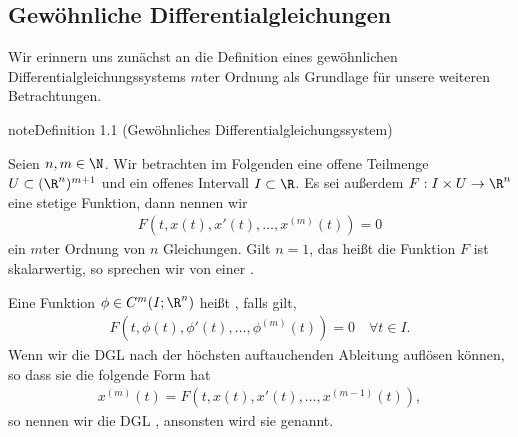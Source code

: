 \documentclass[letterpaper,10pt,english]{jupyterBook}
\begin{document}
\subsection{Gewöhnliche Differentialgleichungen}
\label{\detokenize{ode/repetition:gewohnliche-differentialgleichungen}}
\sphinxAtStartPar
Wir erinnern uns zunächst an die Definition eines gewöhnlichen Differentialgleichungssystems \(m\)\sphinxhyphen{}ter Ordnung als Grundlage für unsere weiteren Betrachtungen.
\label{ode/repetition:def:DGL}
\begin{sphinxadmonition}{note}{Definition 1.1 (Gewöhnliches Differentialgleichungssystem)}



\sphinxAtStartPar
Seien \(n,m \in \N\).
Wir betrachten im Folgenden eine offene Teilmenge \(U\subset (\R^n)^{m+1}\) und ein offenes Intervall \(I\subset\R\).
Es sei außerdem \(F:I\times U\rightarrow\R^n\) eine stetige Funktion, dann nennen wir
\begin{equation}\label{equation:ode/repetition:eq:DGL}
\begin{split}F(t,x(t),x'(t),\ldots,x^{(m)}(t)) = 0\end{split}
\end{equation}
\sphinxAtStartPar
ein  \(m\)\sphinxhyphen{}ter Ordnung von \(n\) Gleichungen.
Gilt \(n=1\), das heißt die Funktion \(F\) ist skalarwertig, so sprechen wir von einer .

\sphinxAtStartPar
Eine Funktion \(\phi\in C^m(I;\R^n)\) heißt , falls gilt,
\begin{equation*}
\begin{split}F(t, \phi(t), \phi'(t), \ldots, \phi^{(m)}(t)) = 0 \quad \forall t\in I.\end{split}
\end{equation*}
\sphinxAtStartPar
Wenn wir die DGL nach der höchsten auftauchenden Ableitung auflösen können, so dass sie die folgende Form hat
\begin{equation*}
\begin{split}x^{(m)}(t) = F(t,x(t),x'(t),\ldots,x^{(m-1)}(t)),\end{split}
\end{equation*}
\sphinxAtStartPar
so nennen wir die DGL , ansonsten wird sie  genannt.
\end{sphinxadmonition}
\end{document}
